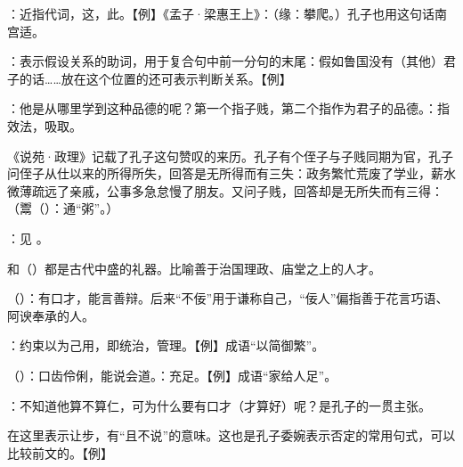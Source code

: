 {
\item {}：近指代词，这，此。【例】《孟子·梁惠王上》：（缘：攀爬。）孔子也用这句话南宫适。

\item {}：表示假设关系的助词，用于复合句中前一分句的末尾：假如鲁国没有（其他）君子的话……放在这个位置的还可表示判断关系。【例】   
\item {}：他是从哪里学到这种品德的呢？第一个指子贱，第二个指作为君子的品德。：指效法，吸取。

《说苑·政理》记载了孔子这句赞叹的来历。孔子有个侄子与子贱同期为官，孔子问侄子从仕以来的所得所失，回答是无所得而有三失：政务繁忙荒废了学业，薪水微薄疏远了亲戚，公事多急怠慢了朋友。又问子贱，回答却是无所失而有三得：（鬻（）：通“粥”。）
}
{}


{
\item {}：见  。
\item {}和（）都是古代中盛的礼器。比喻善于治国理政、庙堂之上的人才。
}
{}


{
\item {}（）：有口才，能言善辩。后来“不佞”用于谦称自己，“佞人”偏指善于花言巧语、阿谀奉承的人。
\item {}：约束以为己用，即统治，管理。【例】成语“以简御繁”。
\item {}（）：口齿伶俐，能说会道。：充足。【例】成语“家给人足”。
\item {}：不知道他算不算仁，可为什么要有口才（才算好）呢？是孔子的一贯主张。

在这里表示让步，有“且不说”的意味。这也是孔子委婉表示否定的常用句式，可以比较前文的。【例】  
}
{}


